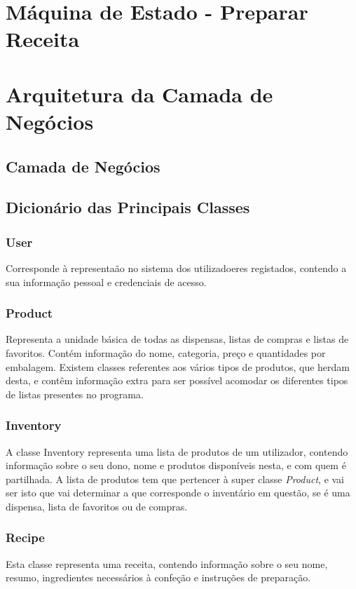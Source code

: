\documentclass[a4paper]{report}
\begin{document}
\chapter{Máquina de Estado - Preparar Receita}

\chapter{Arquitetura da Camada de Negócios}
    \section{Camada de Negócios}
    \section{Dicionário das Principais Classes}
        \subsection{User}
        Corresponde à representaão no sistema dos utilizadoeres registados,
        contendo a sua informação pessoal e credenciais de acesso.
        \subsection{Product}
        Representa a unidade básica de todas as dispensas, listas de compras e
        listas de favoritos. Contém informação do nome, categoria, preço e
        quantidades por embalagem. Existem classes referentes aos vários tipos
        de produtos, que herdam desta, e contêm informação extra para ser
        possível acomodar os diferentes tipos de listas presentes no programa.
        \subsection{Inventory}
        A classe Inventory representa uma lista de produtos de um utilizador, contendo
        informação sobre o seu dono, nome e produtos disponíveis nesta, e 
        com quem é partilhada. A lista de produtos tem que pertencer à super
        classe \textit{Product}, e vai ser isto que vai determinar a que
        corresponde o inventário em questão, se é uma dispensa, lista de
        favoritos ou de compras.
        \subsection{Recipe}
        Esta classe representa uma receita, contendo informação sobre o seu
        nome, resumo, ingredientes necessários à confeção e instruções de
        preparação.
\end{document}
